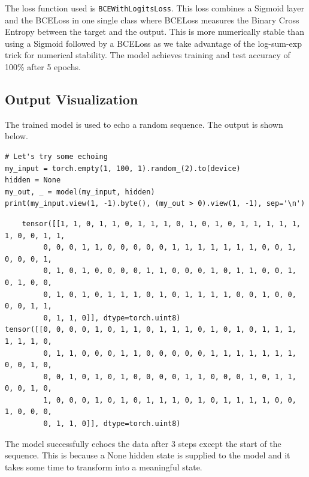 The loss function used is \texttt{BCEWithLogitsLoss}. This loss combines a Sigmoid layer and the BCELoss in one single class where BCELoss measures the Binary Cross Entropy between the target and the output. This is more numerically stable than using a Sigmoid followed by a BCELoss as we take advantage of the log-sum-exp trick for numerical stability. The model achieves training and test accuracy of 100\% after 5 epochs.

\subsection{Output Visualization}
The trained model is used to echo a random sequence. 
The output is shown below.
\begin{verbatim}
# Let's try some echoing
my_input = torch.empty(1, 100, 1).random_(2).to(device)
hidden = None
my_out, _ = model(my_input, hidden)
print(my_input.view(1, -1).byte(), (my_out > 0).view(1, -1), sep='\n')
\end{verbatim}
\begin{verbatim}
    tensor([[1, 1, 0, 1, 1, 0, 1, 1, 1, 0, 1, 0, 1, 0, 1, 1, 1, 1, 1, 1, 0, 0, 1, 1,
         0, 0, 0, 1, 1, 0, 0, 0, 0, 0, 1, 1, 1, 1, 1, 1, 1, 0, 0, 1, 0, 0, 0, 1,
         0, 1, 0, 1, 0, 0, 0, 0, 1, 1, 0, 0, 0, 1, 0, 1, 1, 0, 0, 1, 0, 1, 0, 0,
         0, 1, 0, 1, 0, 1, 1, 1, 0, 1, 0, 1, 1, 1, 1, 0, 0, 1, 0, 0, 0, 0, 1, 1,
         0, 1, 1, 0]], dtype=torch.uint8)
tensor([[0, 0, 0, 0, 1, 0, 1, 1, 0, 1, 1, 1, 0, 1, 0, 1, 0, 1, 1, 1, 1, 1, 1, 0,
         0, 1, 1, 0, 0, 0, 1, 1, 0, 0, 0, 0, 0, 1, 1, 1, 1, 1, 1, 1, 0, 0, 1, 0,
         0, 0, 1, 0, 1, 0, 1, 0, 0, 0, 0, 1, 1, 0, 0, 0, 1, 0, 1, 1, 0, 0, 1, 0,
         1, 0, 0, 0, 1, 0, 1, 0, 1, 1, 1, 0, 1, 0, 1, 1, 1, 1, 0, 0, 1, 0, 0, 0,
         0, 1, 1, 0]], dtype=torch.uint8)
\end{verbatim}
The model successfully echoes the data after 3 steps except the start of the sequence. 
This is because a None hidden state is supplied to the model and it takes some time to transform into a meaningful state.


